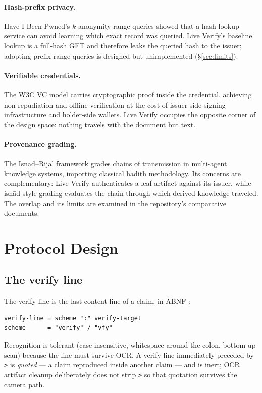 \documentclass[11pt]{article}
\begin{document}
\paragraph{Hash-prefix privacy.} Have I Been Pwned's $k$-anonymity range
queries \cite{ali2018hibp} showed that a hash-lookup service can avoid
learning which exact record was queried. Live Verify's baseline lookup is a
full-hash GET and therefore leaks the queried hash to the issuer; adopting
prefix range queries is designed but unimplemented
(\S\ref{sec:limits}).

\paragraph{Verifiable credentials.} The W3C VC model \cite{w3cvc} carries
cryptographic proof inside the credential, achieving non-repudiation and
offline verification at the cost of issuer-side signing infrastructure and
holder-side wallets. Live Verify occupies the opposite corner of the design
space: nothing travels with the document but text.

\paragraph{Provenance grading.} The Isn\=ad--Rij\=al framework
\cite{raja2026isnad} grades chains of transmission in multi-agent knowledge
systems, importing classical hadith methodology. Its concerns are
complementary: Live Verify authenticates a leaf artifact against its issuer,
while isn\=ad-style grading evaluates the chain through which derived
knowledge traveled. The overlap and its limits are examined in the
repository's comparative documents.

\section{Protocol Design}\label{sec:design}

\subsection{The verify line}
The verify line is the last content line of a claim, in ABNF \cite{rfc5234}:
\begin{verbatim}
verify-line = scheme ":" verify-target
scheme      = "verify" / "vfy"
\end{verbatim}
Recognition is tolerant (case-insensitive, whitespace around the colon,
bottom-up scan) because the line must survive OCR. A verify line immediately
preceded by \texttt{>} is \emph{quoted} --- a claim reproduced inside another
claim --- and is inert; OCR artifact cleanup deliberately does not strip
\texttt{>} so that quotation survives the camera path.
\end{document}
